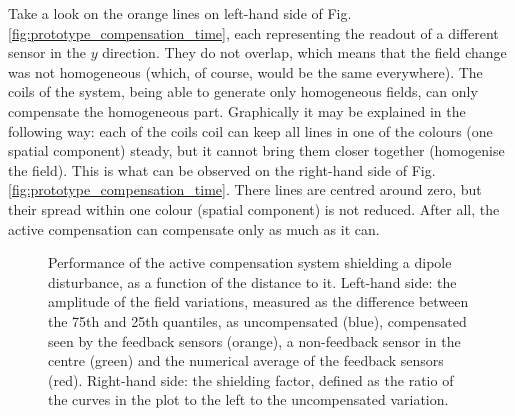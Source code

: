 Take a look on the orange lines on left-hand side of Fig.\,\ref{fig:prototype_compensation_time}, each representing the readout of a different sensor in the $y$ direction. They do not overlap, which means that the field change was not homogeneous (which, of course, would be the same everywhere). The coils of the system, being able to generate only homogeneous fields, can only compensate the homogeneous part. Graphically it may be explained in the following way: each of the coils coil can keep all lines in one of the colours (one spatial component) steady, but it cannot bring them closer together (homogenise the field). This is what can be observed on the right-hand side of Fig.\,\ref{fig:prototype_compensation_time}. There lines are centred around zero, but their spread within one colour (spatial component) is not reduced. After all, the active compensation can compensate only as much as it can.

\begin{figure}
  \centering
  \quad
  \caption{Performance of the active compensation system shielding a dipole disturbance, as a function of the distance to it. Left-hand side: the amplitude of the field variations, measured as the difference between the 75th and 25th quantiles, as uncompensated (blue), compensated seen by the feedback sensors (orange), a non-feedback sensor in the centre (green) and the numerical average of the feedback sensors (red). Right-hand side: the shielding factor, defined as the ratio of the curves in the plot to the left to the uncompensated variation.}
  \label{fig:prototype_compensation}
\end{figure}


